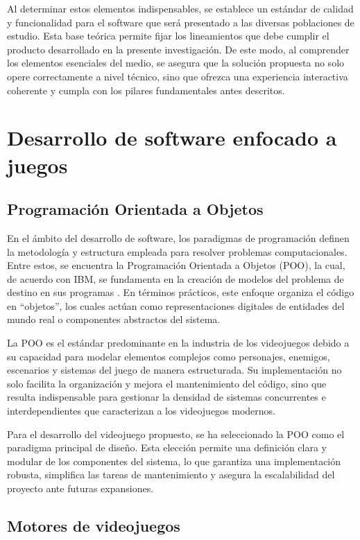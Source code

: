 Al determinar estos elementos indispensables, se establece un estándar de calidad y funcionalidad para el software que será presentado a las diversas poblaciones de estudio. Esta base teórica permite fijar los lineamientos que debe cumplir el producto desarrollado en la presente investigación. De este modo, al comprender los elementos esenciales del medio, se asegura que la solución propuesta no solo opere correctamente a nivel técnico, sino que ofrezca una experiencia interactiva coherente y cumpla con los pilares fundamentales antes descritos.

\section{Desarrollo de software enfocado a juegos}
\subsection{Programación Orientada a Objetos}

En el ámbito del desarrollo de software, los paradigmas de programación definen la metodología y estructura empleada para resolver problemas computacionales. Entre estos, se encuentra la Programación Orientada a Objetos (POO), la cual, de acuerdo con IBM, se fundamenta en la creación de modelos del problema de destino en sus programas \cite{ibm2026spss}. En términos prácticos, este enfoque organiza el código en “objetos”, los cuales actúan como representaciones digitales de entidades del mundo real o componentes abstractos del sistema.

La POO es el estándar predominante en la industria de los videojuegos debido a su capacidad para modelar elementos complejos como personajes, enemigos, escenarios y sistemas del juego de manera estructurada. Su implementación no solo facilita la organización y mejora el mantenimiento del código, sino que resulta indispensable para gestionar la densidad de sistemas concurrentes e interdependientes que caracterizan a los videojuegos modernos.

Para el desarrollo del videojuego propuesto, se ha seleccionado la POO como el paradigma principal de diseño. Esta elección permite una definición clara y modular de los componentes del sistema, lo que garantiza una implementación robusta, simplifica las tareas de mantenimiento y asegura la escalabilidad del proyecto ante futuras expansiones.

\subsection{Motores de videojuegos}

